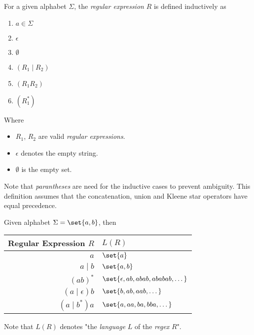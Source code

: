 \begin{definition}
    For a given alphabet $\Sigma$, the \textit{regular expression} $R$ is defined inductively as
    \begin{enumerate}
        \item $a \in \Sigma$
        \item $\epsilon$
        \item $\emptyset$
        \item $(R_1 \mid R_2)$
        \item $(R_1 R_2)$
        \item $(R_1^{\ast})$
    \end{enumerate}
    Where
    \begin{itemize}
        \item $R_1$, $R_2$ are valid \textit{regular expressions}.
        \item $\epsilon$ denotes the empty string.
        \item $\emptyset$ is the empty set.
    \end{itemize}
\end{definition}

\begin{remark}
    Note that \textit{parantheses} are need for the inductive cases to prevent ambiguity. This definition assumes that the concatenation, union and Kleene star operators have equal precedence.
\end{remark}

\begin{example}
    Given alphabet $\Sigma = \set{a, b}$, then
    \begin{table}[H]
        \centering
        \begin{tabular}{@{} r  l @{}}
            \toprule
            Regular Expression $R$ & $L(R)$ \\
            \midrule
            $a$         & $\set{a}$ \\
            $a \mid b$  & $\set{a, b}$ \\
            $(ab)^\ast$ & 
                $\set{\epsilon, ab, abab, ababab, \dots}$ \\
            $(a \mid \epsilon)b$ & $\set{b, ab, aab, \dots}$ \\
            $(a \mid b^\ast)a$ & $\set{a, aa, ba, bba, \dots}$ \\
            \bottomrule
        \end{tabular}
    \end{table}
    
    Note that $L(R)$ denotes "the \textit{language} $L$ of the \textit{regex} $R$".
\end{example}

